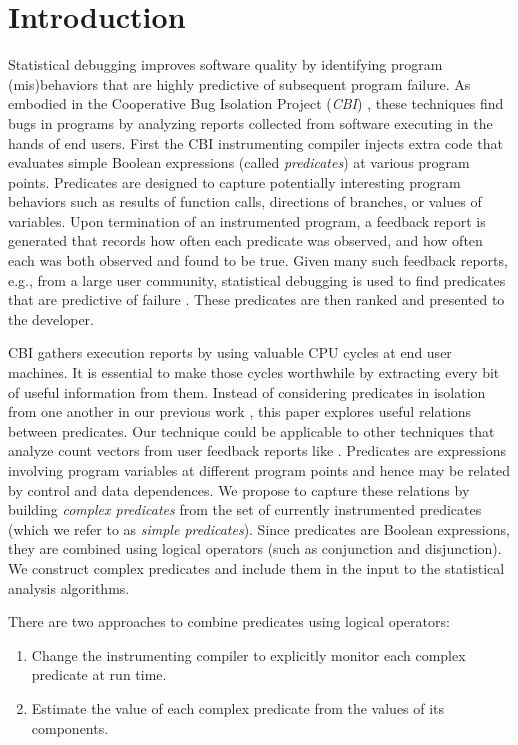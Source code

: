 
\section{Introduction}

Statistical debugging improves software quality by identifying program (mis)behaviors that are highly predictive of subsequent program failure.  As embodied in the Cooperative Bug Isolation Project (\emph{CBI}) \cite{Liblit:2004:CBI}, these techniques find bugs in programs by analyzing reports collected from software executing in the hands of end users.  First the CBI instrumenting compiler injects extra code that evaluates simple Boolean expressions (called \emph{predicates}) at various program points.  Predicates are designed to capture potentially interesting program behaviors such as results of function calls, directions of branches, or values of variables.  Upon termination of an instrumented program, a feedback report is generated that records how often each predicate was observed, and how often each was both observed and found to be true.  Given many such feedback reports, e.g., from a large user community, statistical debugging is used to find predicates that are predictive of failure \cite{Liblit:2005:SSBI,Zheng:2006:SDSIMB}.  These predicates are then ranked and presented to the developer.

CBI gathers execution reports by using valuable CPU cycles at end user machines.  It is essential to make those cycles worthwhile by extracting every bit of useful information from them.  Instead of considering predicates in isolation from one another in our previous work \cite{Liblit:2005:SSBI,Zheng:2006:SDSIMB}, this paper explores useful relations between predicates. Our technique could be applicable to other techniques that analyze count vectors from user feedback reports like \cite{1081753}.  Predicates are expressions involving program variables at different program points and hence may be related by control and data dependences.  We propose to capture these relations by building \emph{complex predicates} from the set of currently instrumented predicates (which we refer to as \emph{simple predicates}).  Since predicates are Boolean expressions, they are combined using logical operators (such as conjunction and disjunction).  We construct complex predicates and include them in the input to the statistical analysis algorithms.

There are two approaches to combine predicates using logical operators:
\begin{enumerate}
\item Change the instrumenting compiler to explicitly monitor each complex predicate at run time.
\item Estimate the value of each complex predicate from the values of its components.
\end{enumerate}

